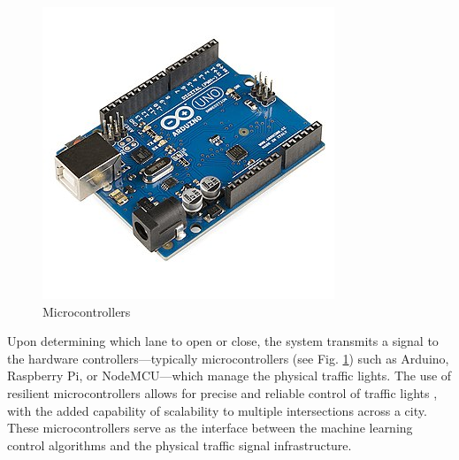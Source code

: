 \documentclass[usenatbib]{tjaa}
\begin{document}
\begin{figure}
\begin{minipage}[b]{0.16\textwidth}
        \centering
        \includegraphics[width=\textwidth]{5.jpg}
    \end{minipage}
    \caption{Microcontrollers}
    \label{fig:f4}
\end{figure}

Upon determining which lane to open or close, the system transmits a signal to the hardware controllers—typically microcontrollers (see Fig. \ref{fig:f4}) such as Arduino, Raspberry Pi, or NodeMCU—which manage the physical traffic lights. The use of resilient microcontrollers allows for precise and reliable control of traffic lights \citep{clar:a12} \citep{clar:a13}, with the added capability of scalability to multiple intersections across a city.
These microcontrollers serve as the interface between the machine learning control algorithms and the physical traffic signal infrastructure.

\end{document}
